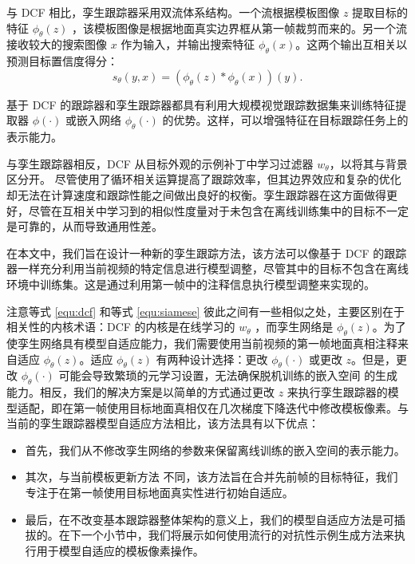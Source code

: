 与 DCF 相比，孪生跟踪器采用双流体系结构。一个流根据模板图像 $z$ 提取目标的特征 $\phi_\theta(z)$ ，该模板图像是根据地面真实边界框从第一帧裁剪而来的。另一个流接收较大的搜索图像 $x$ 作为输入，并输出搜索特征 $\phi_\theta(x)$。这两个输出互相关以预测目标置信度得分：
\begin{equation}
    s_\theta(y,x)=(\phi_\theta(z) * \phi_\theta(x))(y).
    \label{equ:siamese}
\end{equation}

基于 DCF 的跟踪器和孪生跟踪器都具有利用大规模视觉跟踪数据集来训练特征提取器 $\phi(\cdot)$ 或嵌入网络 $\phi_{\theta}(\cdot)$ 的优势。这样，可以增强特征在目标跟踪任务上的表示能力。

与孪生跟踪器相反，DCF 从目标外观的示例补丁中学习过滤器 $w_\theta$，以将其与背景区分开。
尽管使用了循环相关运算提高了跟踪效率，但其边界效应和复杂的优化却无法在计算速度和跟踪性能之间做出良好的权衡。孪生跟踪器在这方面做得更好，尽管在互相关中学习到的相似性度量对于未包含在离线训练集中的目标不一定是可靠的，从而导致通用性差。

在本文中，我们旨在设计一种新的孪生跟踪方法，该方法可以像基于 DCF 的跟踪器一样充分利用当前视频的特定信息进行模型调整，尽管其中的目标不包含在离线环境中训练集。这是通过利用第一帧中的注释信息执行模型调整来实现的。

注意等式 \ref{equ:dcf} 和等式 \ref{equ:siamese} 彼此之间有一些相似之处，主要区别在于相关性的内核术语：DCF 的内核是在线学习的 $w_{\theta}$ ，而孪生网络是 $\phi_\theta(z)$。为了使孪生网络具有模型自适应能力，我们需要使用当前视频的第一帧地面真相注释来自适应 $\phi_\theta(z)$。适应 $\phi_\theta(z)$ 有两种设计选择：更改 $\phi_\theta(\cdot)$ 或更改 $z$。但是，更改 $\phi_\theta(\cdot)$ 可能会导致繁琐的元学习设置，无法确保脱机训练的嵌入空间 \cite{ROAM, DBLP:conf/aaai/JungYNCH20}的生成能力。相反，我们的解决方案是以简单的方式通过更改 $z$ 来执行孪生跟踪器的模型适配，即在第一帧使用目标地面真相仅在几次梯度下降迭代中修改模板像素。与当前的孪生跟踪器模型自适应方法相比，该方法具有以下优点：

\begin{itemize}
\item 首先，我们从不修改孪生网络的参数来保留离线训练的嵌入空间的表示能力。
\item 其次，与当前模板更新方法 \cite{zhu2018distractor, Zhang_2019_ICCV} 不同，该方法旨在合并先前帧的目标特征，我们专注于在第一帧使用目标地面真实性进行初始自适应。
\item 最后，在不改变基本跟踪器整体架构的意义上，我们的模型自适应方法是可插拔的。在下一个小节中，我们将展示如何使用流行的对抗性示例生成方法来执行用于模型自适应的模板像素操作。
\end{itemize}

